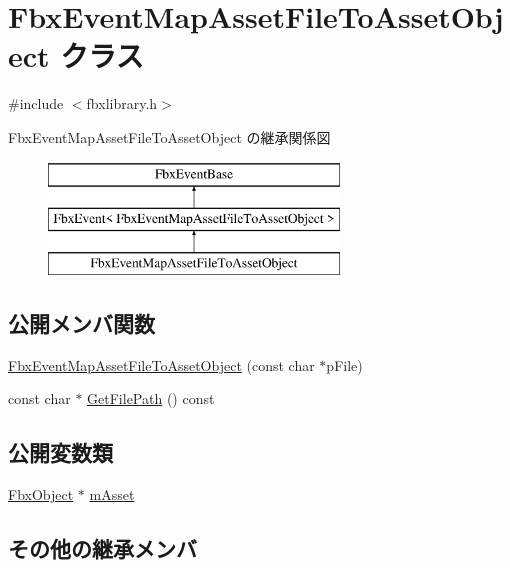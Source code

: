 \hypertarget{class_fbx_event_map_asset_file_to_asset_object}{}\section{Fbx\+Event\+Map\+Asset\+File\+To\+Asset\+Object クラス}
\label{class_fbx_event_map_asset_file_to_asset_object}


{\ttfamily \#include $<$fbxlibrary.\+h$>$}

Fbx\+Event\+Map\+Asset\+File\+To\+Asset\+Object の継承関係図\begin{figure}[H]
\begin{center}
\leavevmode
\includegraphics[height=3.000000cm]{class_fbx_event_map_asset_file_to_asset_object}
\end{center}
\end{figure}
\subsection*{公開メンバ関数}
\begin{DoxyCompactItemize}
\item 
\hyperlink{class_fbx_event_map_asset_file_to_asset_object_ad72d55e79ebd2905e725c2bf90794c73}{Fbx\+Event\+Map\+Asset\+File\+To\+Asset\+Object} (const char $\ast$p\+File)
\item 
const char $\ast$ \hyperlink{class_fbx_event_map_asset_file_to_asset_object_a52c6658860c2ee9d3c5fb74d82ad003e}{Get\+File\+Path} () const
\end{DoxyCompactItemize}
\subsection*{公開変数類}
\begin{DoxyCompactItemize}
\item 
\hyperlink{class_fbx_object}{Fbx\+Object} $\ast$ \hyperlink{class_fbx_event_map_asset_file_to_asset_object_a29d3b4f66df038ce5fbf3832a3cd3f31}{m\+Asset}
\end{DoxyCompactItemize}
\subsection*{その他の継承メンバ}


